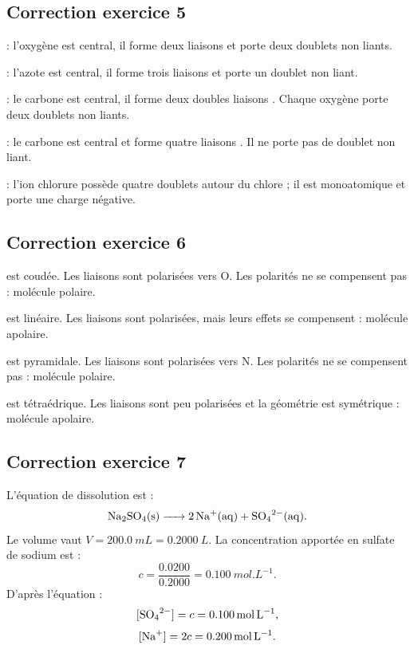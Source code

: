 \documentclass[11pt,a4paper]{article}
\begin{document}
\subsection*{Correction exercice 5}
\begin{correctionbox}
 : l'oxygène est central, il forme deux liaisons  et porte deux doublets non liants.

 : l'azote est central, il forme trois liaisons  et porte un doublet non liant.

 : le carbone est central, il forme deux doubles liaisons . Chaque oxygène porte deux doublets non liants.

 : le carbone est central et forme quatre liaisons . Il ne porte pas de doublet non liant.

 : l'ion chlorure possède quatre doublets autour du chlore ; il est monoatomique et porte une charge négative.
\end{correctionbox}

\subsection*{Correction exercice 6}
\begin{correctionbox}
 est coudée. Les liaisons  sont polarisées vers O. Les polarités ne se compensent pas : molécule polaire.

 est linéaire. Les liaisons  sont polarisées, mais leurs effets se compensent : molécule apolaire.

 est pyramidale. Les liaisons  sont polarisées vers N. Les polarités ne se compensent pas : molécule polaire.

 est tétraédrique. Les liaisons  sont peu polarisées et la géométrie est symétrique : molécule apolaire.
\end{correctionbox}

\subsection*{Correction exercice 7}
\begin{correctionbox}
L'équation de dissolution est :
\[
\ce{Na2SO4(s) -> 2Na+(aq) + SO4^{2-}(aq)}.
\]
Le volume vaut $V=\SI{200.0}{mL}=\SI{0.2000}{L}$. La concentration apportée en sulfate de sodium est :
\[
c=\frac{0.0200}{0.2000}=\SI{0.100}{mol.L^{-1}}.
\]
D'après l'équation :
\[
[\ce{SO4^{2-}}]=c=\SI{0.100}{mol.L^{-1}},
\]
\[
[\ce{Na+}]=2c=\SI{0.200}{mol.L^{-1}}.
\]
\end{correctionbox}
\end{document}
